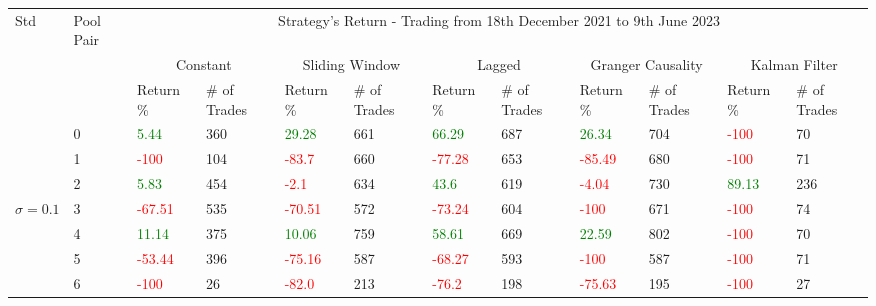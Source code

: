 \begin{table}[!htb]
    \centering
    \begin{adjustwidth}{-0.8in}{-0.9in}
        \begin{tabular}{|p{4em}|p{2em}|p{3em}|p{3em}|p{3em}|p{3em}|p{3em}|p{3em}|p{3em}|p{3em}|p{3em}|p{3em}|}\hline
            Std & Pool Pair & \multicolumn{10}{|c|}{Strategy's Return - Trading from 18th December 2021 to 9th June 2023} \\\cline{3-12}
            &   & \multicolumn{2}{|c|}{Constant} & \multicolumn{2}{|c|}{Sliding Window} & \multicolumn{2}{|c|}{Lagged} & \multicolumn{2}{|c|}{Granger Causality} & \multicolumn{2}{|c|}{Kalman Filter}\\\cline{3-12}
            & & Return \% & \# of Trades & Return \% & \# of Trades & Return \% & \# of Trades & Return \% & \# of Trades & Return \% & \# of Trades\\\hline

            & 0 & \textcolor{green}{5.44} & 360 & \textcolor{green}{29.28} & 661 & \textcolor{green}{66.29} & 687 & \textcolor{green}{26.34} & 704 & \textcolor{red}{-100} & 70\\\cline{3-12}
            & 1 & \textcolor{red}{-100} & 104 & \textcolor{red}{-83.7} & 660 & \textcolor{red}{-77.28} & 653 & \textcolor{red}{-85.49} & 680 & \textcolor{red}{-100} & 71\\\cline{3-12}
            & 2 & \textcolor{green}{5.83} & 454 & \textcolor{red}{-2.1} & 634 & \textcolor{green}{43.6} & 619 & \textcolor{red}{-4.04} & 730 & \textcolor{green}{89.13} & 236\\\cline{3-12}
            $\sigma=0.1$& 3 & \textcolor{red}{-67.51} & 535 & \textcolor{red}{-70.51} & 572 & \textcolor{red}{-73.24} & 604 & \textcolor{red}{-100} & 671 & \textcolor{red}{-100} & 74\\\cline{3-12}
            & 4 & \textcolor{green}{11.14} & 375 & \textcolor{green}{10.06} & 759 & \textcolor{green}{58.61} & 669 & \textcolor{green}{22.59} & 802 & \textcolor{red}{-100} & 70\\\cline{3-12}
            & 5 & \textcolor{red}{-53.44} & 396 & \textcolor{red}{-75.16} & 587 & \textcolor{red}{-68.27} & 593 & \textcolor{red}{-100} & 587 & \textcolor{red}{-100} & 71\\\cline{3-12}
            & 6 & \textcolor{red}{-100} & 26 & \textcolor{red}{-82.0} & 213 & \textcolor{red}{-76.2} & 198 & \textcolor{red}{-75.63} & 195 & \textcolor{red}{-100} & 27\\\hline\hline


\end{tabular}
\end{adjustwidth}
\end{table}
